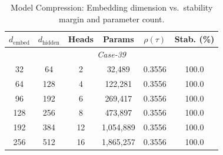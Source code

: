 \begin{table}[t]
\centering
\caption{Model Compression: Embedding dimension vs.\ stability margin and parameter count.}
\label{tab:compression}
\begin{tabular}{cccccc}
\toprule
$d_{\mathrm{embed}}$ & $d_{\mathrm{hidden}}$ & Heads & Params & $\rho(\tau)$ & Stab. (\%) \\
\midrule
\multicolumn{6}{c}{\textit{Case-39}} \\
\midrule
32 & 64 & 2 & 32,489 & 0.3556 & 100.0 \\
64 & 128 & 4 & 122,281 & 0.3556 & 100.0 \\
96 & 192 & 6 & 269,417 & 0.3556 & 100.0 \\
128 & 256 & 8 & 473,897 & 0.3556 & 100.0 \\
192 & 384 & 12 & 1,054,889 & 0.3556 & 100.0 \\
256 & 512 & 16 & 1,865,257 & 0.3556 & 100.0 \\
\bottomrule
\end{tabular}
\end{table}